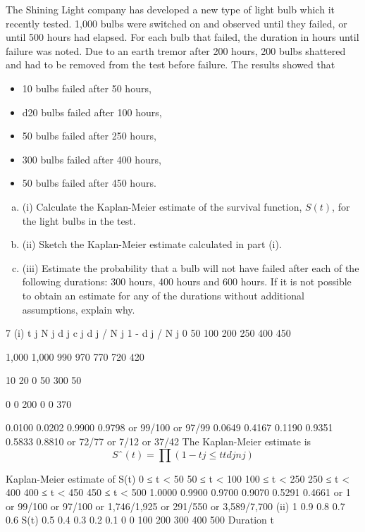 \documentclass[a4paper,12pt]{article}
\begin{document}
\large
\noindent The Shining Light company has developed a new type of light bulb which it recently tested. 1,000 bulbs were switched on and observed until they failed, or until 500 hours had elapsed. For each bulb that failed, the duration in hours until failure was noted. Due to an earth tremor after 200 hours, 200 bulbs shattered and had to be removed from the test before failure. The results showed that 
\begin{itemize}
\item 10 bulbs failed after 50 hours, 
\item d20 bulbs failed after 100 hours,
\item 50 bulbs failed after 250 hours, 
\item 300 bulbs failed after 400 hours,
\item 50 bulbs failed after 450 hours.
\end{itemize}

\begin{enumerate}[(a)]
\item (i) Calculate the Kaplan-Meier estimate of the survival function, $S(t)$, for the light
bulbs in the test.
\item
(ii) Sketch the Kaplan-Meier estimate calculated in part (i).
\item 
(iii) Estimate the probability that a bulb will not have failed after each of the
following durations: 300 hours, 400 hours and 600 hours. If it is not possible
to obtain an estimate for any of the durations without additional assumptions,
explain why.
\end{enumerate}

7
(i)
t j N j d j c j d j / N j 1 - d j / N j 0
50
100
200
250
400
450 

1,000
1,000
990
970
770
720
420 

10
20
0
50
300
50 

0
0
200
0
0
370 

0.0100
0.0202 0.9900
0.9798 or 99/100
or 97/99
0.0649
0.4167
0.1190 0.9351
0.5833
0.8810 or 72/77
or 7/12
or 37/42
The Kaplan-Meier estimate is 
\[ S ˆ ( t ) = ∏ (1 −
t j ≤ t
t
d j
n j
)\]

Kaplan-Meier estimate of S(t)
0 ≤ t < 50
50 ≤ t < 100
100 ≤ t < 250
250 ≤ t < 400
400 ≤ t < 450
450 ≤ t < 500
1.0000
0.9900
0.9700
0.9070
0.5291
0.4661
or 1
or 99/100
or 97/100
or 1,746/1,925
or 291/550
or 3,589/7,700
(ii)
1
0.9
0.8
0.7
0.6
S(t) 0.5
0.4
0.3
0.2
0.1
0
0
100
200
300
400
500
Duration t
\end{document}
